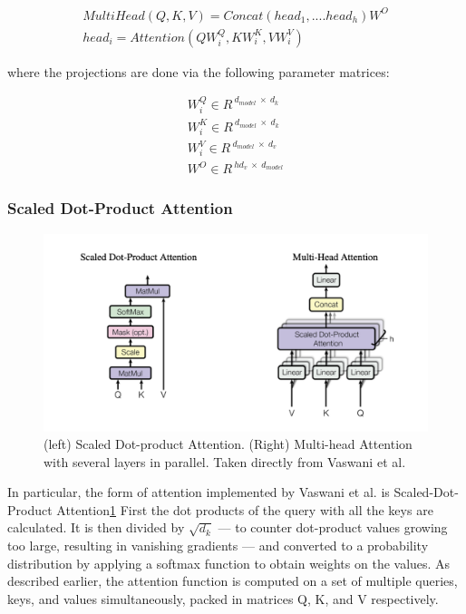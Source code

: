 \documentclass[../main.tex]{subfiles}
\begin{document}
{
    \begin{align*}
    \label{eq:1.2}
    MultiHead (Q,K,V) = Concat(head_1, .... head_h)W^O \\
    head_i = Attention(QW^Q_i, KW^K_i, VW^V_i) 
    \tag{1.2}
    \end{align*}
}

where the projections are done via the following parameter matrices:

{
\large
\begin{align*}
W^Q_i \in R^{\ {d_{model} \ \times \ d_k}} \\
W^K_i \in R^{\ {d_{model} \ \times \ d_k}} \\
W^V_i \in R^{\ {d_{model} \ \times \ d_v}} \\
W^O \in R^{\ {hd_v \ \times \ d_{model}}}
\end{align*}
}

\subsubsection{Scaled Dot-Product Attention}

\begin{figure}[htpb]
    \centering
    \includegraphics[width=1\textwidth]{imgs/scaled_dot_product_attention.png}
    \caption{(left) Scaled Dot-product Attention. (Right) Multi-head Attention with several layers in parallel. Taken directly from Vaswani et al.}
    \label{fig:fig2}
\end{figure}

In particular, the form of attention implemented by Vaswani et al. is Scaled-Dot-Product Attention\ref{fig:fig2} First the dot products of the query with all the keys are calculated. It is then divided by $\sqrt{d_k}$ — to counter dot-product values growing too large, resulting in vanishing gradients — and converted to a probability distribution by applying a softmax function to obtain weights on the values. As described earlier, the attention function is computed on a set of multiple queries, keys, and values simultaneously, packed in matrices Q, K, and V respectively.
\end{document}

